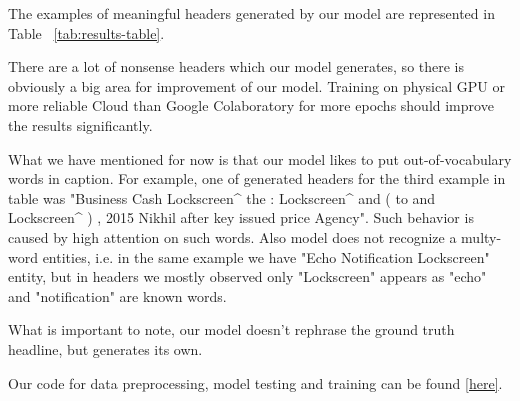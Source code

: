 The examples of meaningful headers generated by our model are represented in 
Table ~\ref{tab:results-table}.

There are a lot of nonsense headers which our model generates, so there is obviously a big area for improvement of our model. Training on physical GPU or more reliable Cloud than Google Colaboratory for more epochs should improve the results significantly.

What we have mentioned for now is that our model likes to put out-of-vocabulary words in caption. For example, one of generated headers for the third example in table was "Business Cash Lockscreen\^{} the : Lockscreen\^{} and ( to and Lockscreen\^{} ) , 2015 Nikhil after key issued price Agency". Such behavior is caused by high attention on such words. Also model does not recognize a multy-word entities, i.e. in the same example we have "Echo Notification Lockscreen" entity, but in headers we mostly observed only "Lockscreen" appears as "echo" and "notification" are known words.

What is important to note, our model doesn't rephrase the ground truth headline, but generates its own.

Our code for data preprocessing, model testing and training can be found \href{https://github.com/mykhaly/text_summarization_using_LSTM}{[here]}.

